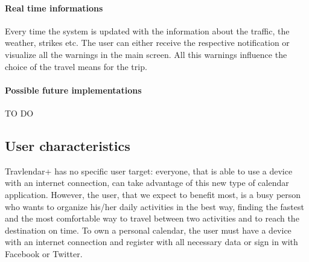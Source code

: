 \documentclass[12pt,titlepage]{article}
\begin{document}
\paragraph{Real time informations}
Every time the system is updated with the information about the traffic, the weather, strikes etc. The user can either receive the respective notification or visualize all the warnings in the main screen. All this warnings influence the choice of the travel means for the trip. 


\paragraph{Possible future implementations} 
TO DO

\subsection{User characteristics}\label{sec:mod1}
Travlendar+ has no specific user target: everyone, that is able to use a device with an internet connection, can take advantage of this new type of calendar application.
However, the user, that we expect to benefit most, is a busy person who wants to organize his/her daily activities in the best way, finding the fastest and the most comfortable way to travel between two activities and to reach the destination on time.
To own a personal calendar, the user must have a device with an internet connection and register with all necessary data or sign in with Facebook or Twitter.
\end{document}
